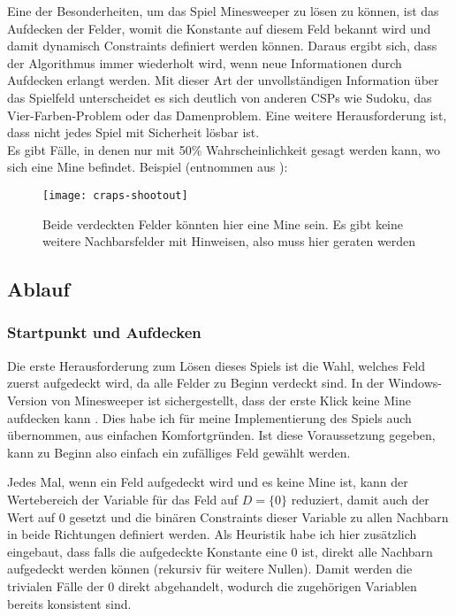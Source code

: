 Eine der Besonderheiten, um das Spiel Minesweeper zu lösen zu können, ist das Aufdecken der Felder, womit die Konstante auf diesem Feld
bekannt wird und damit dynamisch Constraints definiert werden können. Daraus ergibt sich, dass der Algorithmus immer wiederholt wird,
wenn neue Informationen durch Aufdecken erlangt werden. Mit dieser Art der unvollständigen Information über das Spielfeld unterscheidet es
sich deutlich von anderen CSPs wie Sudoku, das Vier-Farben-Problem oder das Damenproblem.
Eine weitere Herausforderung ist, dass nicht jedes Spiel mit Sicherheit lösbar ist.\\ Es gibt Fälle, in denen nur mit 50\% Wahrscheinlichkeit
gesagt werden kann, wo sich eine Mine befindet. Beispiel (entnommen aus \cite{AlgoApproaches}):
\begin{figure}[!htb]
    \centering
    \texttt{[image: craps-shootout]}
    \caption{Beide verdeckten Felder könnten hier eine Mine sein. Es gibt keine weitere Nachbarsfelder mit Hinweisen, also muss hier geraten
    werden}\label{craps}
\end{figure}

\subsection{Ablauf}
\subsubsection{Startpunkt und Aufdecken}

Die erste Herausforderung zum Lösen dieses Spiels ist die Wahl, welches Feld zuerst aufgedeckt wird, da alle Felder zu Beginn verdeckt sind.
In der Windows-Version von Minesweeper ist sichergestellt, dass der erste Klick keine Mine aufdecken kann \cite{MS}. Dies habe ich für 
meine Implementierung des Spiels auch übernommen, aus einfachen Komfortgründen. Ist diese Voraussetzung gegeben, kann zu Beginn also einfach
ein zufälliges Feld gewählt werden.

Jedes Mal, wenn ein Feld aufgedeckt wird und es keine Mine ist, kann der Wertebereich der Variable für
das Feld auf $D=\{0\}$ reduziert, damit auch der Wert auf 0 gesetzt und die binären Constraints dieser Variable zu allen Nachbarn in beide
Richtungen definiert werden. Als Heuristik habe ich hier zusätzlich eingebaut, dass falls die aufgedeckte Konstante eine 0 ist, direkt
alle Nachbarn aufgedeckt werden können (rekursiv für weitere Nullen). Damit werden die trivialen Fälle der 0 direkt abgehandelt, wodurch
die zugehörigen Variablen bereits konsistent sind.

